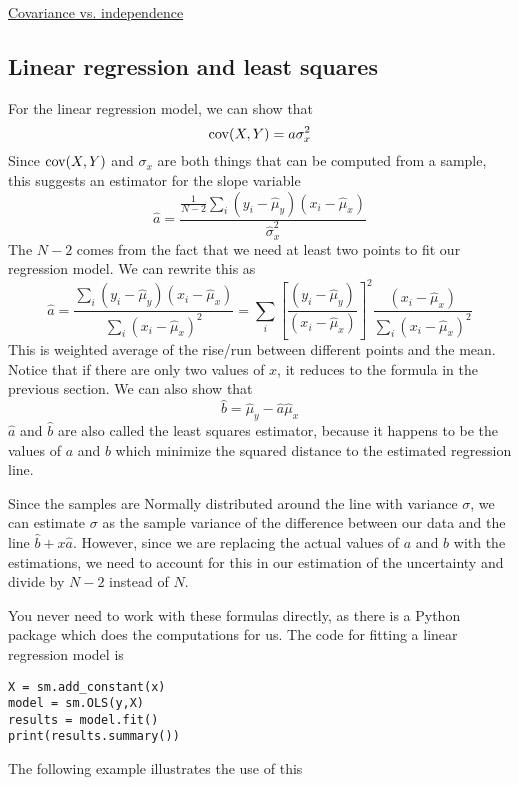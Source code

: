 \begin{example}
\href{https://colab.research.google.com/drive/1QarJhwPmSqCTQ-HwU_lXCUX6uvdhLdrM#scrollTo=uQHmnUY9Yrq-}{Covariance vs. independence}
\end{example}

\subsection{Linear regression and least squares}
For the linear regression model, we can show that
\begin{equation}\label{eq:cov_linear}
{\rm cov}(X,Y) = a\sigma_x^2
\end{equation}
Since ${\rm cov}(X,Y)$ and $\sigma_x$ are both things that can be computed from a sample, this suggests an estimator for the slope variable 
\begin{equation}
\hat{a} = \frac{\frac{1}{N-2}\sum_i (y_i - \hat{\mu}_y)(x_i - \hat{\mu}_x)}{\hat{\sigma}_x^2}
\end{equation}
The $N-2$ comes from the fact that we need at least two points to fit our regression model.
We can rewrite this as 
\begin{equation}
\hat{a} =  \frac{\sum_i (y_i - \hat{\mu}_y)(x_i - \hat{\mu}_x)}{\sum_i (x_i - \hat{\mu}_x)^2} = 
  \sum_i\left[\frac{ (y_i - \hat{\mu}_y)}{ (x_i - \hat{\mu}_x)}\right]^2\frac{(x_i - \hat{\mu}_x)}{\sum_i(x_i - \hat{\mu}_x)^2}
\end{equation}
This is weighted average of the rise/run between different points and the mean. Notice that if there are only two values of $x$, it reduces to the formula in the previous section. 
We can also show that
\begin{equation}
\hat{b} = \hat{\mu}_y - \hat{a}\hat{\mu}_x
\end{equation} 
$\hat{a}$ and $\hat{b}$ are also called the {\dfn least squares estimator}, because it happens to be the values of $a$ and $b$ which minimize the squared distance to the estimated regression line. 

Since the samples are Normally distributed around the line with variance $\sigma$, we can estimate $\sigma$ as the sample variance of the difference between our data and the line $\hat{b} + x \hat{a}$. However, since we are replacing the actual values of $a$ and $b$ with the estimations, we need to account for this in our estimation of the uncertainty and divide by $N-2$ instead of $N$. 

You never need to work with these formulas directly, as there is a Python package which does the computations for us. The code for fitting a linear regression model is 
\begin{Verbatim}
X = sm.add_constant(x)
model = sm.OLS(y,X)
results = model.fit()
print(results.summary())
\end{Verbatim}
The following example illustrates the use of this


